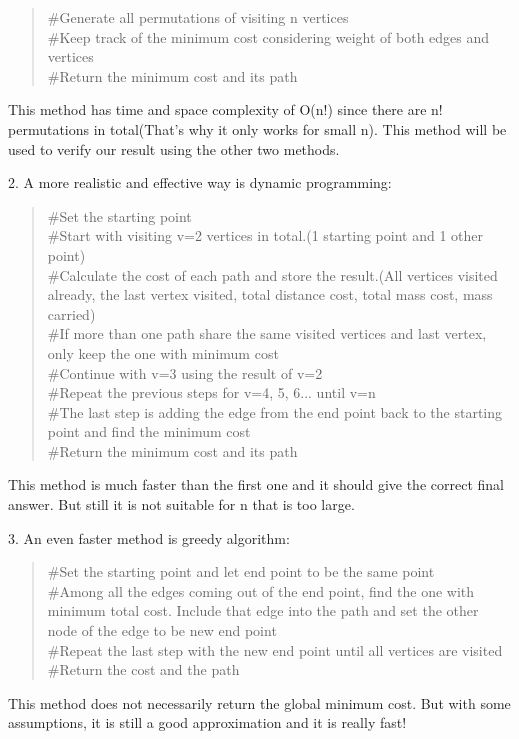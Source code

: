 \begin{itemize}
\begin{quote}
\#Generate all permutations of visiting n vertices
\\
\#Keep track of the minimum cost considering weight of both edges and vertices
\\
\#Return the minimum cost and its path
\end{quote}
This method has time and space complexity of O(n!) since there are n! permutations in total(That's why it only works for small n). This method will be used to verify our result using the other two methods.
\par
2. A more realistic and effective way is dynamic programming:
\begin{quote}
\#Set the starting point
\\
\#Start with visiting v=2 vertices in total.(1 starting point and 1 other point)
\\
\#Calculate the cost of each path and store the result.(All vertices visited already, the last vertex visited, total distance cost, total mass cost, mass carried)
\\
\#If more than one path share the same visited vertices and last vertex, only keep the one with minimum cost
\\
\#Continue with v=3 using the result of v=2
\\
\#Repeat the previous steps for v=4, 5, 6... until v=n
\\
\#The last step is adding the edge from the end point back to the starting point and find the minimum cost
\\
\#Return the minimum cost and its path
\end{quote}
This method is much faster than the first one and it should give the correct final answer. But still it is not suitable for n that is too large.
\par
3. An even faster method is greedy algorithm:
\begin{quote}
\#Set the starting point and let end point to be the same point
\\
\#Among all the edges coming out of the end point, find the one with minimum total cost. Include that edge into the path and set the other node of the edge to be new end point
\\
\#Repeat the last step with the new end point until all vertices are visited
\\
\#Return the cost and the path
\end{quote}
This method does not necessarily return the global minimum cost. But with some assumptions, it is still a good approximation and it is really fast!


\end{itemize}
